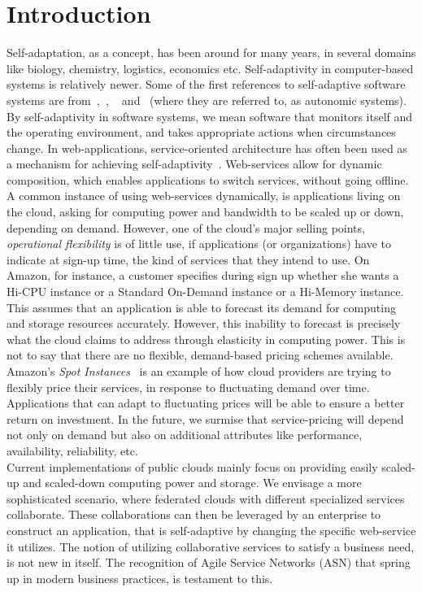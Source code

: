 \documentclass[10pt,journal,compsoc]{IEEEtran}
\begin{document}
\section{Introduction}
Self-adaptation, as a concept, has been around for many years, in several domains like biology, chemistry, logistics, economics etc. Self-adaptivity in computer-based systems is relatively newer. Some of the first references to self-adaptive software systems are from~\cite{Oreizy1998Architecture-based},~\cite{Laddaga1999Creating}, ~\cite{Kokar1999Control} and~\cite{Kephart2003Vision} (where they are referred to, as autonomic systems). By self-adaptivity in software systems, we mean software that monitors itself and the operating environment, and takes appropriate actions when circumstances change. In web-applications, service-oriented architecture has often been used as a mechanism for achieving self-adaptivity~\cite{DiNitto2008journey}. Web-services allow for dynamic composition, which enables applications to switch services, without going offline. A common instance of using web-services dynamically, is applications living on the cloud, asking for computing power and bandwidth to be scaled up or down, depending on demand. However, one of the cloud's major selling points, \textit{operational flexibility} is of little use, if applications (or organizations) have to indicate at sign-up time, the kind of services that they intend to use. On Amazon, for instance, a customer specifies during sign up whether she wants a Hi-CPU instance or a Standard On-Demand instance or a Hi-Memory instance. This assumes that an application is able to forecast its demand for computing and storage resources accurately. However, this inability to forecast is precisely what the cloud claims to address through elasticity in computing power. This is not to say that there are no flexible, demand-based pricing schemes available. Amazon's \textit{Spot Instances}~\cite{Amazon2010SpotInstance} is an example of how cloud providers are trying to flexibly price their services, in response to fluctuating demand over time. Applications that can adapt to fluctuating prices will be able to ensure a better return on investment. In the future, we surmise that service-pricing will depend not only on demand but also on additional attributes like performance, availability, reliability, etc.
\\ 
Current implementations of public clouds mainly focus on providing easily scaled-up and scaled-down computing power and storage. We envisage a more sophisticated scenario, where federated clouds with different specialized services collaborate. These collaborations can then be leveraged by an enterprise to construct an application, that is self-adaptive by changing the specific web-service it utilizes. The notion of utilizing collaborative services to satisfy a business need, is not new in itself. The recognition of Agile Service Networks (ASN) that spring up in modern business practices, is testament to this. 
\end{document}
